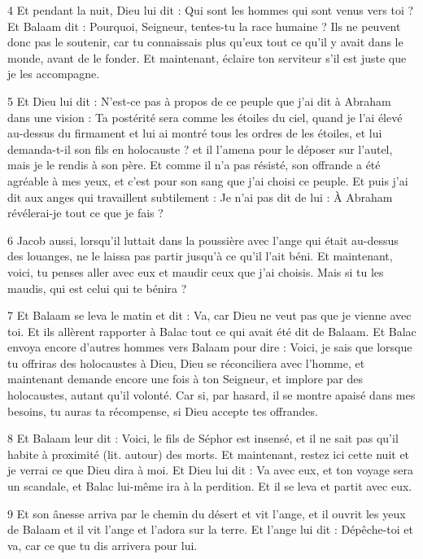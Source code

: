\par 4 Et pendant la nuit, Dieu lui dit : Qui sont les hommes qui sont venus vers toi ? Et Balaam dit : Pourquoi, Seigneur, tentes-tu la race humaine ? Ils ne peuvent donc pas le soutenir, car tu connaissais plus qu'eux tout ce qu'il y avait dans le monde, avant de le fonder. Et maintenant, éclaire ton serviteur s'il est juste que je les accompagne.

\par 5 Et Dieu lui dit : N'est-ce pas à propos de ce peuple que j'ai dit à Abraham dans une vision : Ta postérité sera comme les étoiles du ciel, quand je l'ai élevé au-dessus du firmament et lui ai montré tous les ordres de les étoiles, et lui demanda-t-il son fils en holocauste ? et il l'amena pour le déposer sur l'autel, mais je le rendis à son père. Et comme il n'a pas résisté, son offrande a été agréable à mes yeux, et c'est pour son sang que j'ai choisi ce peuple. Et puis j'ai dit aux anges qui travaillent subtilement : Je n'ai pas dit de lui : À Abraham révélerai-je tout ce que je fais ?

\par 6 Jacob aussi, lorsqu'il luttait dans la poussière avec l'ange qui était au-dessus des louanges, ne le laissa pas partir jusqu'à ce qu'il l'ait béni. Et maintenant, voici, tu penses aller avec eux et maudir ceux que j'ai choisis. Mais si tu les maudis, qui est celui qui te bénira ?

\par 7 Et Balaam se leva le matin et dit : Va, car Dieu ne veut pas que je vienne avec toi. Et ils allèrent rapporter à Balac tout ce qui avait été dit de Balaam. Et Balac envoya encore d'autres hommes vers Balaam pour dire : Voici, je sais que lorsque tu offriras des holocaustes à Dieu, Dieu se réconciliera avec l'homme, et maintenant demande encore une fois à ton Seigneur, et implore par des holocaustes, autant qu'il volonté. Car si, par hasard, il se montre apaisé dans mes besoins, tu auras ta récompense, si Dieu accepte tes offrandes.

\par 8 Et Balaam leur dit : Voici, le fils de Séphor est insensé, et il ne sait pas qu'il habite à proximité (lit. autour) des morts. Et maintenant, restez ici cette nuit et je verrai ce que Dieu dira à moi. Et Dieu lui dit : Va avec eux, et ton voyage sera un scandale, et Balac lui-même ira à la perdition. Et il se leva et partit avec eux.

\par 9 Et son ânesse arriva par le chemin du désert et vit l'ange, et il ouvrit les yeux de Balaam et il vit l'ange et l'adora sur la terre. Et l'ange lui dit : Dépêche-toi et va, car ce que tu dis arrivera pour lui.

